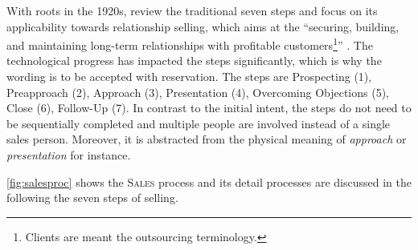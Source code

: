 	With roots in the 1920s, \cite{Moncrief_2005} review the traditional seven steps and focus on its applicability towards relationship selling, which aims at the \enquote{securing, building, and maintaining long-term relationships with profitable customers\footnote{ Clients are meant the outsourcing terminology.}} \citep[]{Moncrief_2005}. The technological progress has impacted the steps significantly, which is why the wording is to be accepted with reservation. The steps are Prospecting (1), Preapproach (2), Approach (3), Presentation (4), Overcoming Objections (5), Close (6), Follow-Up (7). In contrast to the initial intent, the steps do not need to be sequentially completed and multiple people are involved instead of a single sales person. Moreover, it is abstracted from the physical meaning of \textit{approach} or \textit{presentation} for instance.
	
	\Fig \ref{fig:salesproc} shows the \textsc{Sales} process and its detail processes are discussed in the following \wrt the seven steps of selling. 
	
